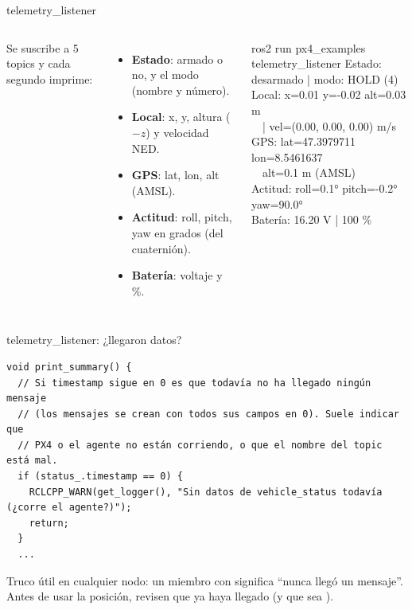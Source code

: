\begin{frame}{telemetry\_listener}
  \begin{columns}[c]
    \small
    Se suscribe a 5 topics y cada segundo imprime:
    \begin{itemize}
      \item \textbf{Estado}: armado o no, y el modo (nombre y número).
      \item \textbf{Local}: x, y, altura ($-z$) y velocidad NED.
      \item \textbf{GPS}: lat, lon, alt (AMSL).
      \item \textbf{Actitud}: roll, pitch, yaw en grados (del cuaternión).
      \item \textbf{Batería}: voltaje y \%.
    \end{itemize}
    \begin{terminal}{ros2 run px4\_examples telemetry\_listener}
Estado: desarmado | modo: HOLD (4)\\
Local: x=0.01 y=-0.02 alt=0.03 m\\
\ \ | vel=(0.00, 0.00, 0.00) m/s\\
GPS: lat=47.3979711 lon=8.5461637\\
\ \ alt=0.1 m (AMSL)\\
Actitud: roll=0.1° pitch=-0.2° yaw=90.0°\\
Batería: 16.20 V | 100 \%
    \end{terminal}
  \end{columns}
\end{frame}

\begin{frame}[fragile]{telemetry\_listener: ¿llegaron datos?}
  \begin{lstlisting}[style=cpp,caption={telemetry\_listener.cpp}]
void print_summary() {
  // Si timestamp sigue en 0 es que todavía no ha llegado ningún mensaje
  // (los mensajes se crean con todos sus campos en 0). Suele indicar que
  // PX4 o el agente no están corriendo, o que el nombre del topic está mal.
  if (status_.timestamp == 0) {
    RCLCPP_WARN(get_logger(), "Sin datos de vehicle_status todavía (¿corre el agente?)");
    return;
  }
  ...
  \end{lstlisting}
  \small
  \begin{idea}
    \small Truco útil en cualquier nodo: un miembro con  significa ``nunca llegó un
    mensaje''. Antes de usar la posición, revisen que ya haya llegado (y que  sea ).
  \end{idea}
\end{frame}

